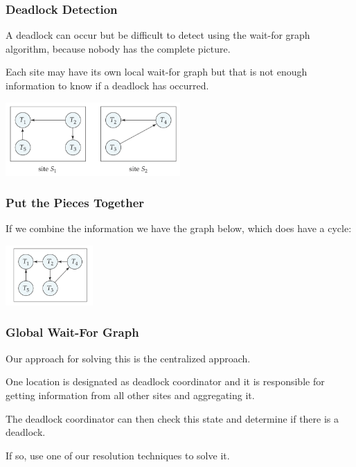 \begin{frame}
\frametitle{Deadlock Detection}

A deadlock can occur but be difficult to detect using the wait-for graph algorithm, because nobody has the complete picture.

Each site may have its own local wait-for graph but that is not enough information to know if a deadlock has occurred.

\begin{center}
\includegraphics[width=0.5\textwidth]{images/waitfor-local}
\end{center}

\end{frame}

\begin{frame}
\frametitle{Put the Pieces Together}

If we combine the information we have the graph below, which does have a cycle:

\begin{center}
\includegraphics[width=0.25\textwidth]{images/waitfor-global}
\end{center}


\end{frame}

\begin{frame}
\frametitle{Global Wait-For Graph}

Our approach for solving this is the centralized approach.

One location is designated as deadlock coordinator and it is responsible for getting information from all other sites and aggregating it. 

The deadlock coordinator can then check this state and determine if there is a deadlock.

If so, use one of our resolution techniques to solve it.

\end{frame}

